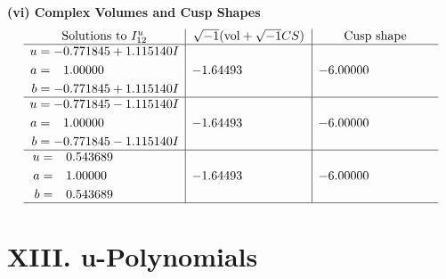 \documentclass[1p]{elsarticle_modified}
\theoremstyle{definition}
\newcommand{\I}{\sqrt{-1}}
\begin{document}
\newpage\flushleft \textbf{(vi) Complex Volumes and Cusp Shapes}
$$\begin{array}{c|c|c}  
\text{Solutions to }I^u_{12}& \I (\text{vol} + \sqrt{-1}CS) & \text{Cusp shape}\\
 \hline 
\begin{aligned}
u &= -0.771845 + 1.115140 I \\
a &= \phantom{-}1.00000\phantom{ +0.000000I} \\
b &= -0.771845 + 1.115140 I\end{aligned}
 & -1.64493\phantom{ +0.000000I} & -6.00000\phantom{ +0.000000I} \\ \hline\begin{aligned}
u &= -0.771845 - 1.115140 I \\
a &= \phantom{-}1.00000\phantom{ +0.000000I} \\
b &= -0.771845 - 1.115140 I\end{aligned}
 & -1.64493\phantom{ +0.000000I} & -6.00000\phantom{ +0.000000I} \\ \hline\begin{aligned}
u &= \phantom{-}0.543689\phantom{ +0.000000I} \\
a &= \phantom{-}1.00000\phantom{ +0.000000I} \\
b &= \phantom{-}0.543689\phantom{ +0.000000I}\end{aligned}
 & -1.64493\phantom{ +0.000000I} & -6.00000\phantom{ +0.000000I}\\
 \hline 
 \end{array}$$\newpage
\newpage\renewcommand{\arraystretch}{1}
\centering \section*{ XIII. u-Polynomials}
\end{document}
